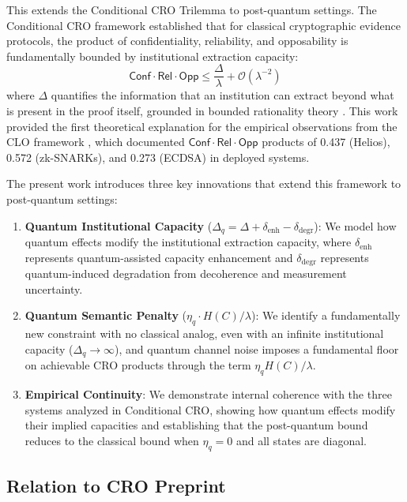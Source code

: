 \documentclass{ieeeaccess}
\newcommand{\Conf}{\mathsf{Conf}}
\newcommand{\Rel}{\mathsf{Rel}}
\newcommand{\Opp}{\mathsf{Opp}}
\begin{document}
This extends the Conditional CRO Trilemma \cite{Minka2026CRO} to post-quantum settings. The Conditional CRO framework established that for classical cryptographic evidence protocols, the product of confidentiality, reliability, and opposability is fundamentally bounded by institutional extraction capacity:
\begin{equation}
    \Conf \cdot \Rel \cdot \Opp \leq \frac{\Delta}{\lambda} + \mathcal{O}(\lambda^{-2})
\end{equation}
where $\Delta$ quantifies the information that an institution can extract beyond what is present in the proof itself, grounded in bounded rationality theory \cite{Simon1957, Miller1956}. This work provided the first theoretical explanation for the empirical observations from the CLO framework \cite{Minka2026CLO}, which documented $\Conf \cdot \Rel \cdot \Opp$ products of 0.437 (Helios), 0.572 (zk-SNARKs), and 0.273 (ECDSA) in deployed systems.

The present work introduces three key innovations that extend this framework to post-quantum settings:

\begin{enumerate}
    \item \textbf{Quantum Institutional Capacity} ($\Delta_q = \Delta + \delta_{\text{enh}} - \delta_{\text{degr}}$): We model how quantum effects modify the institutional extraction capacity, where $\delta_{\text{enh}}$ represents quantum-assisted capacity enhancement and $\delta_{\text{degr}}$ represents quantum-induced degradation from decoherence and measurement uncertainty.

    \item \textbf{Quantum Semantic Penalty} ($\eta_q \cdot H(C)/\lambda$): We identify a fundamentally new constraint with no classical analog, even with an infinite institutional capacity ($\Delta_q \to \infty$), and quantum channel noise imposes a fundamental floor on achievable CRO products through the term $\eta_q H(C)/\lambda$.

    \item \textbf{Empirical Continuity}: We demonstrate internal coherence with the three systems analyzed in Conditional CRO, showing how quantum effects modify their implied capacities and establishing that the post-quantum bound reduces to the classical bound when $\eta_q = 0$ and all states are diagonal.
\end{enumerate}

\subsection{Relation to CRO Preprint}
\end{document}
